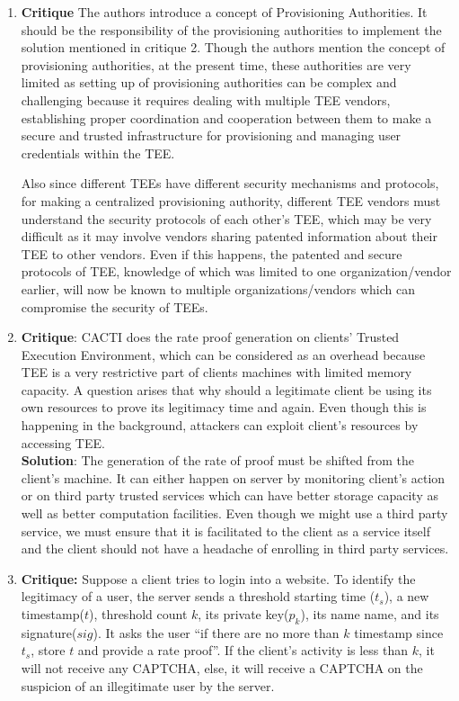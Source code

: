 \documentclass[runningheads,10pt]{llncs}
\begin{document}
\begin{enumerate}
		\item \textbf{Critique} The authors introduce a concept of Provisioning Authorities. It should be the responsibility of the provisioning authorities to implement the solution mentioned in critique 2. Though the authors mention the concept of provisioning authorities, at the present time, these authorities are very limited as setting up of provisioning authorities can be complex and challenging because it requires dealing with multiple TEE vendors, establishing proper coordination and cooperation between them to make a secure and trusted infrastructure for provisioning and managing user credentials within the TEE.

		Also since different TEEs have different security mechanisms and protocols, for making a centralized provisioning authority, different TEE vendors must understand the security protocols of each other’s TEE, which may be very difficult as it may involve vendors sharing patented information about their TEE to other vendors. Even if this happens, the patented and secure protocols of TEE, knowledge of which was limited to one organization/vendor earlier, will now be known to multiple organizations/vendors which can compromise the security of TEEs.\\



		\item \textbf{Critique}: CACTI\cite{ourpaper} does the rate proof generation on clients' Trusted Execution Environment, which can be considered as an overhead because TEE is a very restrictive part of clients machines with limited memory capacity. A question arises that why should a legitimate client be using its own resources to prove its legitimacy time and again. Even though this is happening in the background, attackers can exploit client’s resources by accessing TEE.\\

		\textbf{Solution}: The generation of the rate of proof must be shifted from the client's machine. It can either happen on server by monitoring client’s action or on third party trusted services which can have better storage capacity as well as better computation facilities. Even though we might use a third party service, we must ensure that it is facilitated to the client as a service itself and the client should not have a headache of enrolling in third party services.\\

		\item \textbf{Critique:} Suppose a client tries to login into a website. To identify the legitimacy of a user, the server sends a threshold starting time ($t_{s}$), a new timestamp($t$), threshold count $k$, its private key($p_k$), its name name, and its signature($sig$). It asks the user “if there are no more than $k$ timestamp since $t_s$, store $t$ and provide a rate proof”. If the client's activity is less than $k$, it will not receive any CAPTCHA, else, it will receive a CAPTCHA on the suspicion of an illegitimate user by the server.


\end{enumerate}
\end{document}
